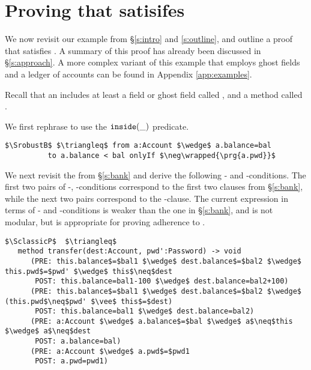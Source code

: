 \section{Proving that \ModC satisifes \SrobustB}
\label{s:examples}
We now revisit our example from  \S  \ref{s:intro} and \ref{s:outline},
and outline a proof that \ModC satisfies \SrobustB. 
A {summary} of this proof has already been discussed in \S \ref{s:approach}.
 A more complex variant of this example that employs ghost fields and a ledger of accounts can be found in Appendix \ref{app:examples}. 

 
Recall that an  includes %
 at least a  field {or ghost field} called , and a method called . 

%
 We first rephrase 
\SrobustB to use the $\texttt{inside}( \_ )$ predicate.
\begin{lstlisting}[language=Chainmail, mathescape=true, frame=lines]
$\SrobustB$ $\triangleq$ from a:Account $\wedge$ a.balance=bal 
          to a.balance < bal onlyIf $\neg\wrapped{\prg{a.pwd}}$
\end{lstlisting}

We next revisit the   \funcSpec from \S \ref{s:bank} and derive the following 
- and -conditions. The first two pairs of -, -conditions correspond to the first two 
clauses from \S \ref{s:bank}, while the next two pairs correspond to the -clause. The current expression in terms
of - and -conditions is weaker than the one in \S \ref{s:bank}, and is not modular, but is
appropriate for proving adherence to  \SrobustB.

\begin{lstlisting}[mathescape=true, frame=lines, language=Chainmail]
$\SclassicP$  $\triangleq$
   method transfer(dest:Account, pwd':Password) -> void  
      (PRE: this.balance$=$bal1 $\wedge$ dest.balance$=$bal2 $\wedge$ this.pwd$=$pwd' $\wedge$ this$\neq$dest
       POST: this.balance=bal1-100 $\wedge$ dest.balance=bal2+100)
      (PRE: this.balance$=$bal1 $\wedge$ dest.balance$=$bal2 $\wedge$ (this.pwd$\neq$pwd' $\vee$ this$=$dest)
       POST: this.balance=bal1 $\wedge$ dest.balance=bal2)
      (PRE: a:Account $\wedge$ a.balance$=$bal $\wedge$ a$\neq$this $\wedge$ a$\neq$dest 
       POST: a.balance=bal)          
      (PRE: a:Account $\wedge$ a.pwd$=$pwd1  
       POST: a.pwd=pwd1)         
\end{lstlisting}


